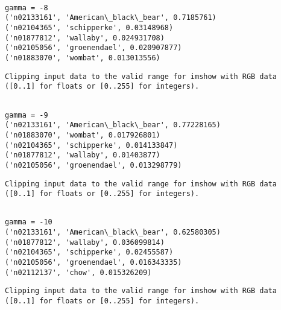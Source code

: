 \documentclass[11pt]{article}
\begin{document}
    \begin{Verbatim}[commandchars=\\\{\}]

gamma = -8
('n02133161', 'American\_black\_bear', 0.7185761)
('n02104365', 'schipperke', 0.03148968)
('n01877812', 'wallaby', 0.024931708)
('n02105056', 'groenendael', 0.020907877)
('n01883070', 'wombat', 0.013013556)

    \end{Verbatim}

    \begin{Verbatim}[commandchars=\\\{\}]
Clipping input data to the valid range for imshow with RGB data ([0..1] for floats or [0..255] for integers).

    \end{Verbatim}

    \begin{Verbatim}[commandchars=\\\{\}]

gamma = -9
('n02133161', 'American\_black\_bear', 0.77228165)
('n01883070', 'wombat', 0.017926801)
('n02104365', 'schipperke', 0.014133847)
('n01877812', 'wallaby', 0.01403877)
('n02105056', 'groenendael', 0.013298779)

    \end{Verbatim}

    \begin{Verbatim}[commandchars=\\\{\}]
Clipping input data to the valid range for imshow with RGB data ([0..1] for floats or [0..255] for integers).

    \end{Verbatim}

    \begin{Verbatim}[commandchars=\\\{\}]

gamma = -10
('n02133161', 'American\_black\_bear', 0.62580305)
('n01877812', 'wallaby', 0.036099814)
('n02104365', 'schipperke', 0.02455587)
('n02105056', 'groenendael', 0.016343335)
('n02112137', 'chow', 0.015326209)

    \end{Verbatim}

    \begin{Verbatim}[commandchars=\\\{\}]
Clipping input data to the valid range for imshow with RGB data ([0..1] for floats or [0..255] for integers).

    \end{Verbatim}
\end{document}
